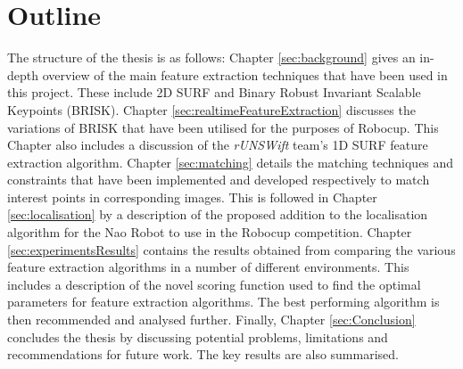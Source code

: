 %




\section{Outline}
\label{sec:outline}
The structure of the thesis is as follows: Chapter \ref{sec:background} gives an in-depth overview of the main feature extraction techniques that have been used in this project. These include 2D SURF and Binary Robust Invariant Scalable Keypoints (BRISK). Chapter \ref{sec:realtimeFeatureExtraction} discusses the variations of BRISK that have been utilised for the purposes of Robocup. This Chapter also includes a discussion of the \textit{rUNSWift} team's 1D SURF feature extraction algorithm. Chapter \ref{sec:matching} details the matching techniques and constraints that have been implemented and developed respectively to match interest points in corresponding images. This is followed in Chapter \ref{sec:localisation} by a description of the proposed addition to the localisation algorithm for the Nao Robot to use in the Robocup competition. Chapter \ref{sec:experimentsResults} contains the results obtained from comparing the various feature extraction algorithms in a number of different environments. This includes a description of the novel scoring function used to find the optimal parameters for feature extraction algorithms. The best performing algorithm is then recommended and analysed further. Finally, Chapter \ref{sec:Conclusion} concludes the thesis by discussing potential problems, limitations and recommendations for future work. The key results are also summarised.\\